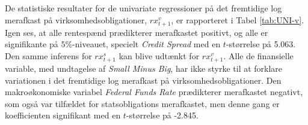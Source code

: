 \documentclass[
  a4paper,
  oneside]{memoir}
\begin{document}
\begin{table}[!h]
\begin{threeparttable}
\begin{tablenotes}
\end{tablenotes}
\end{threeparttable}
\end{table}

De statistiske resultater for de univariate regressioner på det fremtidige log merafkast på virksomhedsobligationer, \(rx_{t+1}^v\), er rapporteret i Tabel \ref{tab:UNI-v}. Igen ses, at alle rentespænd prædikterer merafkastet positivt, og alle er signifikante på \(5\%\)-niveauet, specielt \emph{Credit Spread} med en \(t\)-størrelse på 5.063. Den samme inferens for \(rx_{t+1}^s\) kan blive udtænkt for \(rx_{t+1}^v\). Alle de finansielle variable, med undtagelse af \emph{Small Minus Big}, har ikke styrke til at forklare variationen i det fremtidige log merafkast på virksomhedsobligationer. Den makroøkonomiske variabel \emph{Federal Funds Rate} prædikterer merafkastet negativt, som også var tilfældet for statsobligations merafkastet, men denne gang er koefficienten signifikant med en \(t\)-størrelse på -2.845.
\end{document}
